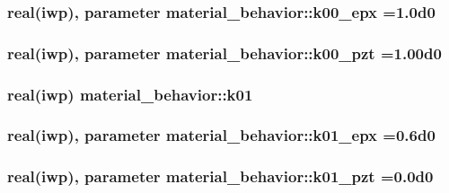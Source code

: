\subsubsection[{k00\+\_\+epx}]{\setlength{\rightskip}{0pt plus 5cm}real(iwp), parameter material\+\_\+behavior\+::k00\+\_\+epx =1.\+0d0}\label{classmaterial__behavior_a97caf4b28ab3c5c68ccc7333ab2883f2}
\hypertarget{classmaterial__behavior_ac66973ce0f7b60b348a950b3c4df80ed}{}
\subsubsection[{k00\+\_\+pzt}]{\setlength{\rightskip}{0pt plus 5cm}real(iwp), parameter material\+\_\+behavior\+::k00\+\_\+pzt =1.\+00d0}\label{classmaterial__behavior_ac66973ce0f7b60b348a950b3c4df80ed}
\hypertarget{classmaterial__behavior_ae934e25b34ba7c6241ab81a13b9d4d9c}{}
\subsubsection[{k01}]{\setlength{\rightskip}{0pt plus 5cm}real(iwp) material\+\_\+behavior\+::k01}\label{classmaterial__behavior_ae934e25b34ba7c6241ab81a13b9d4d9c}
\hypertarget{classmaterial__behavior_a2cdeac845e9ad00ce067bf8d97470328}{}
\subsubsection[{k01\+\_\+epx}]{\setlength{\rightskip}{0pt plus 5cm}real(iwp), parameter material\+\_\+behavior\+::k01\+\_\+epx =0.\+6d0}\label{classmaterial__behavior_a2cdeac845e9ad00ce067bf8d97470328}
\hypertarget{classmaterial__behavior_a6464410d3cb39865aa5f39b324a30380}{}
\subsubsection[{k01\+\_\+pzt}]{\setlength{\rightskip}{0pt plus 5cm}real(iwp), parameter material\+\_\+behavior\+::k01\+\_\+pzt =0.\+0d0}\label{classmaterial__behavior_a6464410d3cb39865aa5f39b324a30380}
\hypertarget{classmaterial__behavior_a87bcf8ea95320967838eb79ea1185bcf}{}
